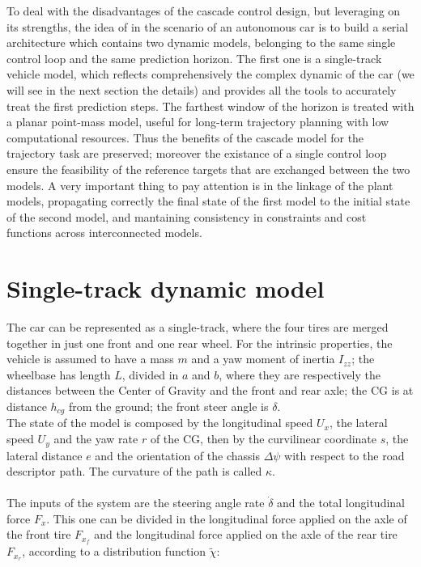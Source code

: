 \documentclass[a4paper, onecolumn, 11pt, twoside]{article}
\begin{document}
To deal with the disadvantages of the cascade control design, but leveraging on its 
strengths, the idea of \cite{paper} in the scenario of an autonomous car is to build 
a serial architecture which contains two dynamic models, belonging to the same single
control loop and the same prediction horizon. The first one is a single-track vehicle
model, which reflects comprehensively the complex dynamic of the car (we will see in the 
next section the details) and provides all the tools to accurately treat the first
prediction steps. The farthest window of the horizon is treated with a planar point-mass 
model, useful for long-term trajectory planning with low computational resources.
Thus the benefits of the cascade model for the trajectory task are preserved; moreover
the existance of a single control loop ensure the feasibility of the reference targets
that are exchanged between the two models. A very important thing to pay attention is 
in the linkage of the plant models, propagating correctly the final state of the first
model to the initial state of the second model, and mantaining consistency in constraints
and cost functions across interconnected models.


\section*{Single-track dynamic model}
The car can be represented as a single-track, where the four tires are merged together in
just one front and one rear wheel.
For the intrinsic properties, the vehicle is assumed to have a mass $m$ and a yaw moment of
inertia $I_{zz}$; the wheelbase has length $L$, divided in $a$ and $b$, where they are respectively
the distances between the Center of Gravity and the front and rear axle; the CG is at distance 
$h_{cg}$ from the ground; the front steer angle is $\delta$. \\
The state of the model
is composed by the longitudinal speed $U_x$, the lateral speed $U_y$ and the yaw rate $r$ of
the CG, then by the curvilinear coordinate $s$, the lateral distance $e$ and the orientation 
of the chassis $\Delta \psi$ with respect to the road descriptor path. The curvature of the path
is called $\kappa$. \\
\\
The inputs of the system are the steering angle rate $\dot{\delta}$ and the total longitudinal 
force $F_x$. This one can be divided in the longitudinal force applied on the axle of the front 
tire $F_{x_f}$ and the longitudinal force applied on the axle of the rear tire $F_{x_r}$,
according to a distribution function $\tilde{\chi}$:
\end{document}
